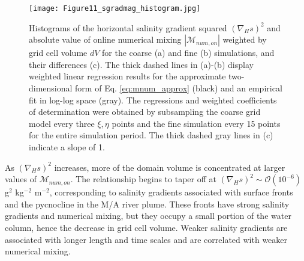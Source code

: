 \documentclass[draft]{agujournal2019}
\begin{document}
\begin{figure}[ht!]
 \centerline{\texttt{[image: Figure11\_sgradmag\_histogram.jpg]}}
  \caption{Histograms of the horizontal salinity gradient squared $(\nabla_H s)^2$ and absolute value of online numerical mixing $|\mathcal{M}_{num, on}|$ weighted by grid cell volume $dV$ for the coarse (a) and fine (b) simulations, and their differences (c). The thick dashed lines in (a)-(b) display weighted linear regression results for the approximate two-dimensional form of Eq. \ref{eq:mnum_approx} (black) and an empirical fit in log-log space (gray). The regressions and weighted coefficients of determination were obtained by subsampling the coarse grid model every three $\xi,\eta$ points and the fine simulation every 15 points for the entire simulation period. The thick dashed gray lines in (c) indicate a slope of 1.}
  \label{fig:mnum_sgrad}
\end{figure}

As $(\nabla_H s)^2$ increases, more of the domain volume is concentrated at larger values of $\mathcal{M}_{num, on}$. The relationship begins to taper off at $(\nabla_H s)^2 \sim \mathcal{O}(10^{-6})$ g$^2$ kg$^{-2}$ m$^{-2}$, corresponding to salinity gradients associated with surface fronts and the pycnocline in the M/A river plume. These fronts have strong salinity gradients and numerical mixing, but they occupy a small portion of the water column, hence the decrease in grid cell volume. Weaker salinity gradients are associated with longer length and time scales and are correlated with weaker numerical mixing. 
\end{document}
